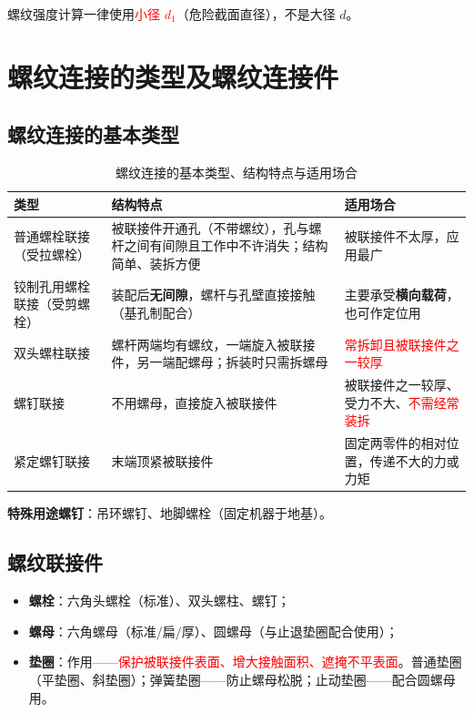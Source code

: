 \begin{note}
螺纹强度计算一律使用\textcolor{red}{小径 $d_1$}（危险截面直径），不是大径 $d$。
\end{note}

\section{螺纹连接的类型及螺纹连接件}
\label{sec:螺纹连接类型}

\subsection{螺纹连接的基本类型}

\begin{definition}[螺纹连接的五种基本类型]
\label{def:螺纹连接类型}
\begin{table}[H]
\centering
\caption{螺纹连接的基本类型、结构特点与适用场合}
\label{tab:连接:基本类型}
\begin{tabular}{p{2.6cm}p{6.2cm}p{3.6cm}}
	\toprule
	类型 & 结构特点 & 适用场合 \\
	\midrule
	普通螺栓联接（受拉螺栓） & 被联接件开通孔（不带螺纹），孔与螺杆之间有间隙且工作中不许消失；结构简单、装拆方便 & 被联接件不太厚，应用最广 \\
	铰制孔用螺栓联接（受剪螺栓） & 装配后\textbf{无间隙}，螺杆与孔壁直接接触（基孔制配合） & 主要承受\textbf{横向载荷}，也可作定位用 \\
	双头螺柱联接 & 螺杆两端均有螺纹，一端旋入被联接件，另一端配螺母；拆装时只需拆螺母 & \textcolor{red}{常拆卸且被联接件之一较厚} \\
	螺钉联接 & 不用螺母，直接旋入被联接件 & 被联接件之一较厚、受力不大、\textcolor{red}{不需经常装拆} \\
	紧定螺钉联接 & 末端顶紧被联接件 & 固定两零件的相对位置，传递不大的力或力矩 \\
	\bottomrule
\end{tabular}
\end{table}

\textbf{特殊用途螺钉}：吊环螺钉、地脚螺栓（固定机器于地基）。
\end{definition}

\subsection{螺纹联接件}

\begin{definition}[螺栓、螺母与垫圈]
\label{def:联接件}
\begin{itemize}
	\item \textbf{螺栓}：六角头螺栓（标准）、双头螺柱、螺钉；
	\item \textbf{螺母}：六角螺母（标准/扁/厚）、圆螺母（与止退垫圈配合使用）；
	\item \textbf{垫圈}：作用——\textcolor{red}{保护被联接件表面、增大接触面积、遮掩不平表面}。普通垫圈（平垫圈、斜垫圈）；弹簧垫圈——防止螺母松脱；止动垫圈——配合圆螺母用。
\end{itemize}
\end{definition}

